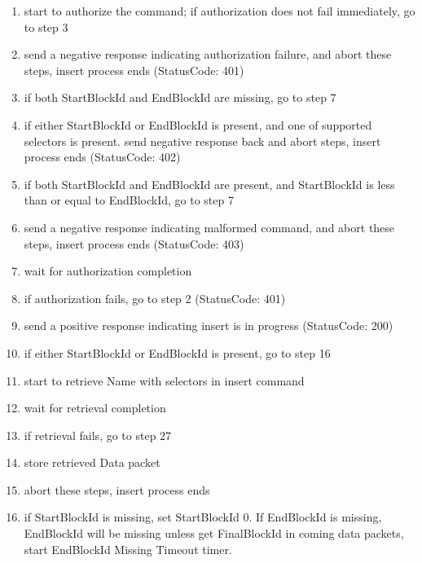 \documentclass{acm_proc_article-sp}
\begin{document}
\begin{enumerate}

\item start to authorize the command; if authorization does not fail immediately, go to step 3

\item send a negative response indicating authorization failure, and abort these steps, insert process ends (StatusCode: 401)

\item if both StartBlockId and EndBlockId are missing, go to step 7

\item if either StartBlockId or EndBlockId is present, and one of supported selectors is present. send negative response back and abort steps, insert process ends (StatusCode: 402)

\item if both StartBlockId and EndBlockId are present, and StartBlockId is less than or equal to EndBlockId, go to step 7

\item send a negative response indicating malformed command, and abort these steps, insert process ends (StatusCode: 403)

\item wait for authorization completion

\item if authorization fails, go to step 2 (StatusCode: 401)

\item send a positive response indicating insert is in progress (StatusCode: 200)

\item if either StartBlockId or EndBlockId is present, go to step 16

\item start to retrieve Name with selectors in insert command

\item wait for retrieval completion

\item if retrieval fails, go to step 27

\item store retrieved Data packet

\item abort these steps, insert process ends

\item if StartBlockId is missing, set StartBlockId 0. If EndBlockId is missing, EndBlockId will be missing unless get FinalBlockId in coming data packets, start EndBlockId Missing Timeout timer.


\end{enumerate}
\end{document}
